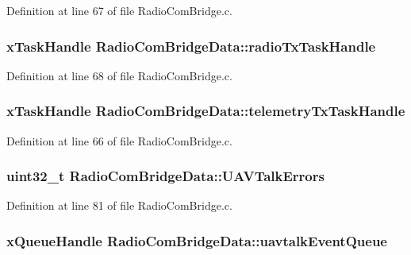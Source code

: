 \-Definition at line 67 of file \-Radio\-Com\-Bridge.\-c.

\hypertarget{struct_radio_com_bridge_data_af39b9a5475db119fb3e7502f1c73ac16}{
\subsubsection[{radio\-Tx\-Task\-Handle}]{\setlength{\rightskip}{0pt plus 5cm}x\-Task\-Handle {\bf \-Radio\-Com\-Bridge\-Data\-::radio\-Tx\-Task\-Handle}}}\label{struct_radio_com_bridge_data_af39b9a5475db119fb3e7502f1c73ac16}


\-Definition at line 68 of file \-Radio\-Com\-Bridge.\-c.

\hypertarget{struct_radio_com_bridge_data_a189160ac3985d53d095bce400a1a7a5f}{
\subsubsection[{telemetry\-Tx\-Task\-Handle}]{\setlength{\rightskip}{0pt plus 5cm}x\-Task\-Handle {\bf \-Radio\-Com\-Bridge\-Data\-::telemetry\-Tx\-Task\-Handle}}}\label{struct_radio_com_bridge_data_a189160ac3985d53d095bce400a1a7a5f}


\-Definition at line 66 of file \-Radio\-Com\-Bridge.\-c.

\hypertarget{struct_radio_com_bridge_data_a1c4163b0b99110e783fba534b15458c1}{
\subsubsection[{\-U\-A\-V\-Talk\-Errors}]{\setlength{\rightskip}{0pt plus 5cm}uint32\-\_\-t {\bf \-Radio\-Com\-Bridge\-Data\-::\-U\-A\-V\-Talk\-Errors}}}\label{struct_radio_com_bridge_data_a1c4163b0b99110e783fba534b15458c1}


\-Definition at line 81 of file \-Radio\-Com\-Bridge.\-c.

\hypertarget{struct_radio_com_bridge_data_adf0a6424f27b6767c1633071f3867154}{
\subsubsection[{uavtalk\-Event\-Queue}]{\setlength{\rightskip}{0pt plus 5cm}x\-Queue\-Handle {\bf \-Radio\-Com\-Bridge\-Data\-::uavtalk\-Event\-Queue}}}\label{struct_radio_com_bridge_data_adf0a6424f27b6767c1633071f3867154}


